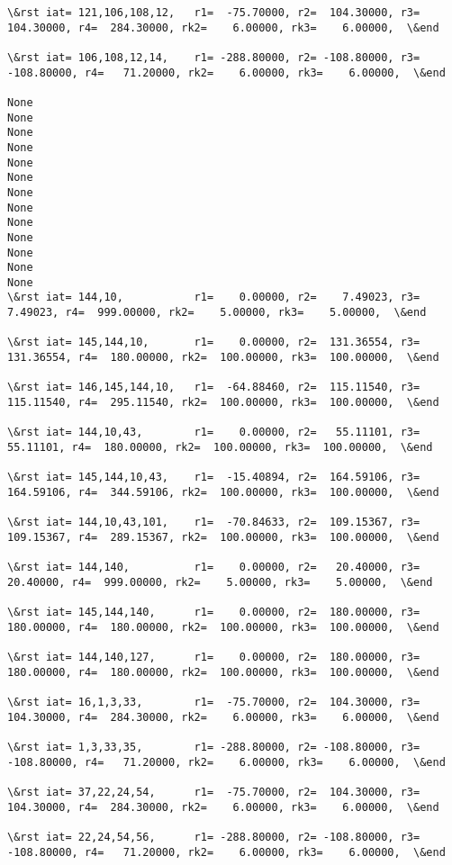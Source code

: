 \documentclass[11pt]{article}
\begin{document}
\begin{Verbatim}[commandchars=\\\{\}]
\&rst iat= 121,106,108,12,   r1=  -75.70000, r2=  104.30000, r3=  104.30000, r4=  284.30000, rk2=    6.00000, rk3=    6.00000,  \&end

\&rst iat= 106,108,12,14,    r1= -288.80000, r2= -108.80000, r3= -108.80000, r4=   71.20000, rk2=    6.00000, rk3=    6.00000,  \&end

None
None
None
None
None
None
None
None
None
None
None
None
None
\&rst iat= 144,10,           r1=    0.00000, r2=    7.49023, r3=    7.49023, r4=  999.00000, rk2=    5.00000, rk3=    5.00000,  \&end

\&rst iat= 145,144,10,       r1=    0.00000, r2=  131.36554, r3=  131.36554, r4=  180.00000, rk2=  100.00000, rk3=  100.00000,  \&end

\&rst iat= 146,145,144,10,   r1=  -64.88460, r2=  115.11540, r3=  115.11540, r4=  295.11540, rk2=  100.00000, rk3=  100.00000,  \&end

\&rst iat= 144,10,43,        r1=    0.00000, r2=   55.11101, r3=   55.11101, r4=  180.00000, rk2=  100.00000, rk3=  100.00000,  \&end

\&rst iat= 145,144,10,43,    r1=  -15.40894, r2=  164.59106, r3=  164.59106, r4=  344.59106, rk2=  100.00000, rk3=  100.00000,  \&end

\&rst iat= 144,10,43,101,    r1=  -70.84633, r2=  109.15367, r3=  109.15367, r4=  289.15367, rk2=  100.00000, rk3=  100.00000,  \&end

\&rst iat= 144,140,          r1=    0.00000, r2=   20.40000, r3=   20.40000, r4=  999.00000, rk2=    5.00000, rk3=    5.00000,  \&end

\&rst iat= 145,144,140,      r1=    0.00000, r2=  180.00000, r3=  180.00000, r4=  180.00000, rk2=  100.00000, rk3=  100.00000,  \&end

\&rst iat= 144,140,127,      r1=    0.00000, r2=  180.00000, r3=  180.00000, r4=  180.00000, rk2=  100.00000, rk3=  100.00000,  \&end

\&rst iat= 16,1,3,33,        r1=  -75.70000, r2=  104.30000, r3=  104.30000, r4=  284.30000, rk2=    6.00000, rk3=    6.00000,  \&end

\&rst iat= 1,3,33,35,        r1= -288.80000, r2= -108.80000, r3= -108.80000, r4=   71.20000, rk2=    6.00000, rk3=    6.00000,  \&end

\&rst iat= 37,22,24,54,      r1=  -75.70000, r2=  104.30000, r3=  104.30000, r4=  284.30000, rk2=    6.00000, rk3=    6.00000,  \&end

\&rst iat= 22,24,54,56,      r1= -288.80000, r2= -108.80000, r3= -108.80000, r4=   71.20000, rk2=    6.00000, rk3=    6.00000,  \&end


\end{Verbatim}
\end{document}
